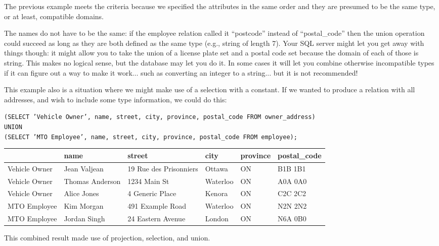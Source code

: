 The previous example meets the criteria because we specified the attributes in the same order and they are presumed to be the same type, or at least, compatible domains.

The names do not have to be the same: if the employee relation called it ``postcode'' instead of ``postal\_code'' then the union operation could succeed as long as they are both defined as the same type (e.g., string of length 7). Your SQL server might let you get away with things though: it might allow you to take the union of a license plate set and a postal code set because the domain of each of those is string. This makes no logical sense, but the database may let you do it. In some cases it will let you combine otherwise incompatible types if it can figure out a way to make it work... such as converting an integer to a string... but it is not recommended!

This example also is a situation where we might make use of a selection with a constant. If we wanted to produce a relation with all addresses, and wish to include some type information, we could do this:

\texttt{(SELECT 'Vehicle Owner', name, street, city, province, postal\_code FROM owner\_address)\\
UNION\\
(SELECT 'MTO Employee', name, street, city, province, postal\_code FROM employee);}

\begin{center}
	\begin{tabular}{|l|l|l|l|l|l|}\hline
		\textbf{} & \textbf{name} &\textbf{street} & \textbf{city} & \textbf{province} & \textbf{postal\_code} \\ \hline
		Vehicle Owner & Jean Valjean & 19 Rue des Prisonniers & Ottawa & ON & B1B 1B1\\ \hline
		Vehicle Owner & Thomas Anderson & 1234 Main St & Waterloo & ON & A0A 0A0\\ \hline
		Vehicle Owner & Alice Jones & 4 Generic Place & Kenora & ON & C2C 2C2\\ \hline
		MTO Employee & Kim Morgan & 491 Example Road & Waterloo & ON & N2N 2N2\\ \hline
		MTO Employee & Jordan Singh & 24 Eastern Avenue & London & ON & N6A 0B0\\ \hline
	\end{tabular}
\end{center}

This combined result made use of projection, selection, and union. 





